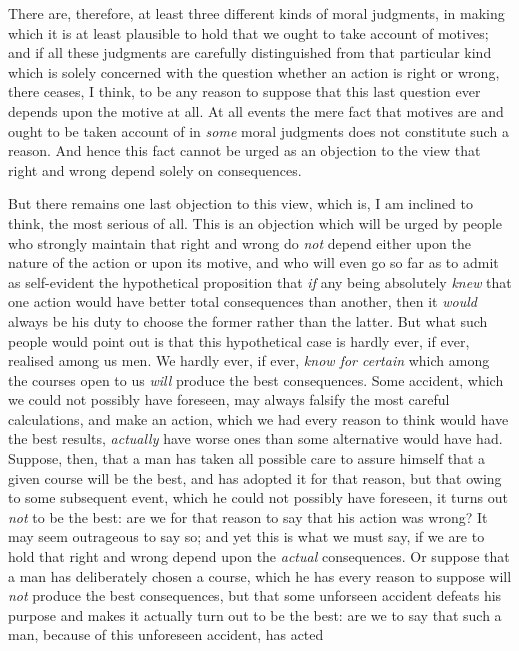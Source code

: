 There are, therefore, at least three different kinds of moral
judgments, in making which it is at least plausible to hold that we
ought to take account of motives; and if all these judgments are
carefully distinguished from that particular kind which is solely
concerned with the question whether an action is right  or
wrong, there ceases, I think, to be any reason to suppose that this
last question ever depends upon the motive at all. At all events the
mere fact that motives are and ought to be taken account of in
\textit{some} moral judgments does not constitute such a reason. And
hence this fact cannot be urged as an objection to the view that right
and wrong depend solely on consequences.

But there remains one last objection to this view, which is, I am
inclined to think, the most serious of all. This is an objection which
will be urged by people who strongly maintain that right and wrong do
\textit{not} depend either upon the nature of the action or upon its
motive, and who will even go so far as to admit as self-evident the
hypothetical proposition that \textit{if} any being absolutely
\textit{knew} that one action would have better total consequences
than another, then it \textit{would} always be his duty to choose the
former rather than the latter. But what such people would point out is
that this hypothetical case is hardly ever, if ever, realised among us
men. We hardly ever, if ever, \textit{know for certain} which among
the  courses open to us \textit{will} produce the best
consequences. Some accident, which we could not possibly have
foreseen, may always falsify the most careful calculations, and make
an action, which we had every reason to think would have the best
results, \textit{actually} have worse ones than some alternative would
have had. Suppose, then, that a man has taken all possible care to
assure himself that a given course will be the best, and has adopted
it for that reason, but that owing to some subsequent event, which he
could not possibly have foreseen, it turns out \textit{not} to be the
best: are we for that reason to say that his action was wrong? It may
seem outrageous to say so; and yet this is what we must say, if we are
to hold that right and wrong depend upon the \textit{actual}
consequences. Or suppose that a man has deliberately chosen a course,
which he has every reason to suppose will \textit{not} produce the
best consequences, but that some unforseen accident defeats his
purpose and makes it actually turn out to be the best: are we to say
that such a man, because of this unforeseen accident, has acted
